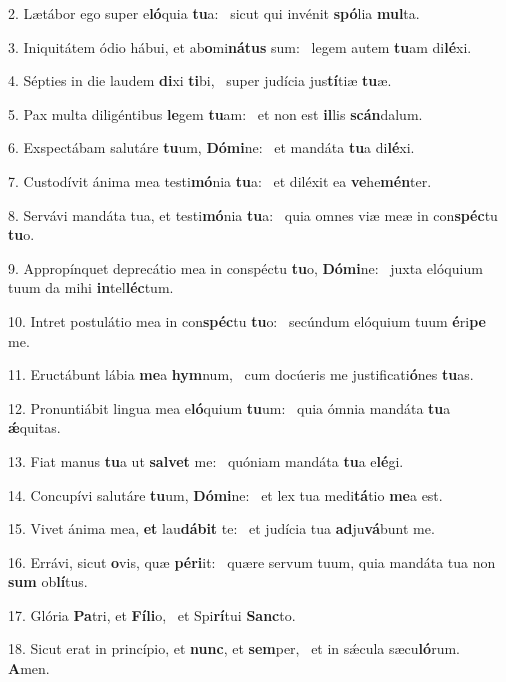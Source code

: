 2. Lætábor ego super e\textbf{ló}quia \textbf{tu}a: \ast\  sicut qui invénit \textbf{spó}lia \textbf{mul}ta.\

3. Iniquitátem ódio hábui, et ab\textbf{o}mi\textbf{ná}\textbf{tus} sum: \ast\  legem autem \textbf{tu}am di\textbf{lé}xi.\

4. Sépties in die laudem \textbf{di}xi \textbf{ti}bi, \ast\  super judícia jus\textbf{tí}tiæ \textbf{tu}æ.\

5. Pax multa diligéntibus \textbf{le}gem \textbf{tu}am: \ast\  et non est \textbf{il}lis \textbf{scán}dalum.\

6. Exspectábam salutáre \textbf{tu}um, \textbf{Dó}\textbf{mi}ne: \ast\  et mandáta \textbf{tu}a di\textbf{lé}xi.\

7. Custodívit ánima mea testi\textbf{mó}nia \textbf{tu}a: \ast\  et diléxit ea \textbf{ve}he\textbf{mén}ter.\

8. Servávi mandáta tua, et testi\textbf{mó}nia \textbf{tu}a: \ast\  quia omnes viæ meæ in con\textbf{spéc}tu \textbf{tu}o.\

9. Appropínquet deprecátio mea in conspéctu \textbf{tu}o, \textbf{Dó}\textbf{mi}ne: \ast\  juxta elóquium tuum da mihi \textbf{in}tel\textbf{léc}tum.\

10. Intret postulátio mea in con\textbf{spéc}tu \textbf{tu}o: \ast\  secúndum elóquium tuum \textbf{é}ri\textbf{pe} me.\

11. Eructábunt lábia \textbf{me}a \textbf{hym}num, \ast\  cum docúeris me justificati\textbf{ó}nes \textbf{tu}as.\

12. Pronuntiábit lingua mea e\textbf{ló}quium \textbf{tu}um: \ast\  quia ómnia mandáta \textbf{tu}a \textbf{ǽ}quitas.\

13. Fiat manus \textbf{tu}a ut \textbf{sal}\textbf{vet} me: \ast\  quóniam mandáta \textbf{tu}a e\textbf{lé}gi.\

14. Concupívi salutáre \textbf{tu}um, \textbf{Dó}\textbf{mi}ne: \ast\  et lex tua medi\textbf{tá}tio \textbf{me}a est.\

15. Vivet ánima mea, \textbf{et} lau\textbf{dá}\textbf{bit} te: \ast\  et judícia tua \textbf{ad}ju\textbf{vá}bunt me.\

16. Errávi, sicut \textbf{o}vis, quæ \textbf{pér}\textbf{i}it: \ast\  quære servum tuum, quia mandáta tua non \textbf{sum} ob\textbf{lí}tus.\

17. Glória \textbf{Pa}tri, et \textbf{Fí}\textbf{li}o, \ast\  et Spi\textbf{rí}tui \textbf{Sanc}to.\

18. Sicut erat in princípio, et \textbf{nunc}, et \textbf{sem}per, \ast\  et in sǽcula sæcu\textbf{ló}rum. \textbf{A}men.\

